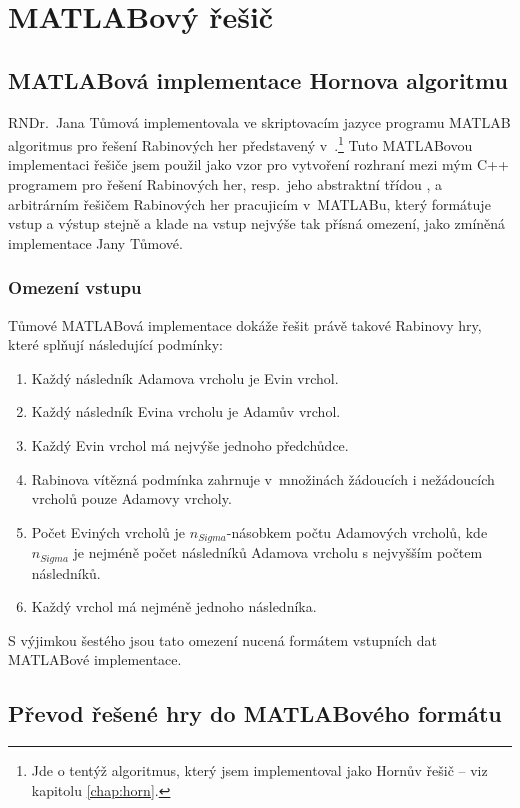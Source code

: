 \chapter{MATLABový řešič} \label{chap:matlab}
\section{MATLABová implementace Hornova algoritmu}
RNDr.~Jana Tůmová implementovala ve skriptovacím jazyce programu MATLAB algoritmus pro řešení Rabinových her představený v~\cite{Horn2005}.\footnote{Jde o tentýž algoritmus, který jsem implementoval jako Hornův řešič -- viz kapitolu \ref{chap:horn}.} Tuto MATLABovou implementaci řešiče jsem použil jako vzor pro vytvoření rozhraní mezi mým C++ programem pro řešení Rabinových her, resp.~jeho abstraktní třídou , a arbitrárním řešičem Rabinových her pracujicím v~MATLABu, který formátuje vstup a výstup stejně a klade na vstup nejvýše tak přísná omezení, jako zmíněná implementace Jany Tůmové.
\subsection{Omezení vstupu}
Tůmové MATLABová implementace dokáže řešit právě takové Rabinovy hry, které splňují následující podmínky:
\begin{enumerate}
\item Každý následník Adamova vrcholu je Evin vrchol.
\item Každý následník Evina vrcholu je Adamův vrchol.
\item Každý Evin vrchol má nejvýše jednoho předchůdce.
\item Rabinova vítězná podmínka zahrnuje v~množinách žádoucích i nežádoucích vrcholů pouze Adamovy vrcholy.
\item Počet Eviných vrcholů je $n_{Sigma}$-násobkem počtu Adamových vrcholů, kde $n_{Sigma}$ je nejméně počet následníků Adamova vrcholu s nejvyšším počtem následníků.
\item \label{item:matlab:vrcholmanaslednika}
Každý vrchol má nejméně jednoho následníka.
\end{enumerate}
S výjimkou šestého jsou tato omezení nucená formátem vstupních dat MATLABové implementace.
\section{Převod řešené hry do MATLABového formátu}
